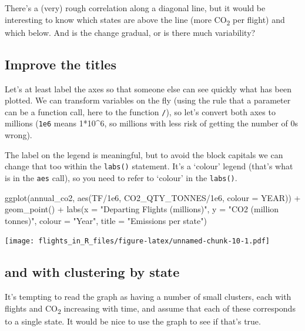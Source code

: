 \documentclass[
]{book}
\newenvironment{Shaded}{\begin{snugshade}}{\end{snugshade}}
\newcommand{\AttributeTok}[1]{\textcolor[rgb]{0.77,0.63,0.00}{#1}}
\newcommand{\FloatTok}[1]{\textcolor[rgb]{0.00,0.00,0.81}{#1}}
\newcommand{\FunctionTok}[1]{\textcolor[rgb]{0.00,0.00,0.00}{#1}}
\newcommand{\NormalTok}[1]{#1}
\newcommand{\SpecialCharTok}[1]{\textcolor[rgb]{0.00,0.00,0.00}{#1}}
\newcommand{\StringTok}[1]{\textcolor[rgb]{0.31,0.60,0.02}{#1}}
\begin{document}
There's a (very) rough correlation along a diagonal line, but it would be interesting to know which states are above the line (more CO\textsubscript{2} per flight) and which below. And is the change gradual, or is there much variability?

\hypertarget{improve-the-titles}{%
\subsection{Improve the titles}\label{improve-the-titles}}

Let's at least label the axes so that someone else can see quickly what has been plotted. We can transform variables on the fly (using the rule that a parameter can be a function call, here to the function \texttt{/}), so let's convert both axes to millions (\texttt{1e6} means 1*10\^{}6, so millions with less risk of getting the number of 0s wrong).

The label on the legend is meaningful, but to avoid the block capitals we can change that too within the \texttt{labs()} statement. It's a `colour' legend (that's what is in the \texttt{aes} call), so you need to refer to `colour' in the \texttt{labs()}.

\begin{Shaded}
\begin{Highlighting}[]
\FunctionTok{ggplot}\NormalTok{(annual\_co2, }\FunctionTok{aes}\NormalTok{(TF}\SpecialCharTok{/}\FloatTok{1e6}\NormalTok{, CO2\_QTY\_TONNES}\SpecialCharTok{/}\FloatTok{1e6}\NormalTok{, }\AttributeTok{colour =}\NormalTok{ YEAR)) }\SpecialCharTok{+}
  \FunctionTok{geom\_point}\NormalTok{() }\SpecialCharTok{+} 
  \FunctionTok{labs}\NormalTok{(}\AttributeTok{x =} \StringTok{"Departing Flights (millions)"}\NormalTok{, }
       \AttributeTok{y =} \StringTok{"CO2 (million tonnes)"}\NormalTok{,}
       \AttributeTok{colour =} \StringTok{"Year"}\NormalTok{,}
       \AttributeTok{title =} \StringTok{"Emissions per state"}\NormalTok{)}
\end{Highlighting}
\end{Shaded}

\texttt{[image: flights\_in\_R\_files/figure-latex/unnamed-chunk-10-1.pdf]}

\hypertarget{statecluster}{%
\subsection{and with clustering by state}\label{statecluster}}

It's tempting to read the graph as having a number of small clusters, each with flights and CO\textsubscript{2} increasing with time, and assume that each of these corresponds to a single state. It would be nice to use the graph to see if that's true.
\end{document}
